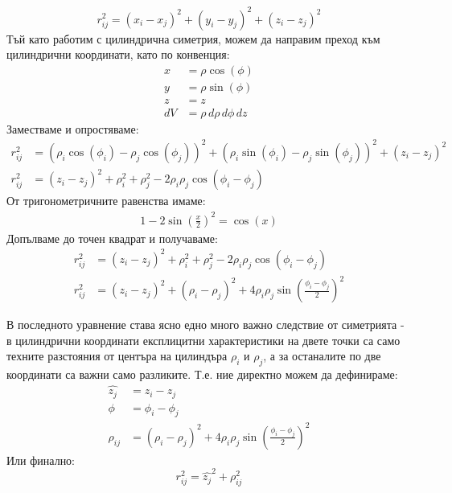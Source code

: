 \begin{equation}
	r_{ij}^2 = (x_{i} - x_{j})^2  + (y_{i} - y_{j})^2 + (z_{i}-z_{j})^2
	\label{eq:cartesian}
\end{equation}
Тъй като работим с цилиндрична симетрия, можем да направим преход към цилиндрични координати, като по конвенция:
\begin{align*}
	x  & = \rho \cos(\phi)           \\
	y  & = \rho \sin(\phi)           \\
	z  & = z                         \\
	dV & = \rho \,d\rho \,d\phi \,dz
\end{align*}
Заместваме и опростяваме:
\begin{align*}
	r_{ij}^2 & = (\rho_{i}\cos(\phi_{i}) - \rho_{j}\cos(\phi_{j}))^2 + (\rho_{i}\sin(\phi_{i}) - \rho_{j}\sin(\phi_{j}))^2 + (z_i - z_j)^2 \\
	r_{ij}^2 & = (z_i - z_j)^2 + \rho_{i}^2 + \rho_{j}^2 - 2\rho_{i}\rho_{j}\cos{(\phi_i - \phi_j)}
\end{align*}
От тригонометричните равенства имаме:
\begin{align*}
	1-2 \sin{\left(\frac{x}{2}\right)}^2=\cos (x)
\end{align*}
Допълваме до точен квадрат и получаваме:
\begin{align*}
	r_{ij}^2 & = (z_i - z_j)^2 + \rho_{i}^2 + \rho_{j}^2 - 2\rho_{i}\rho_{j}\cos{(\phi_i - \phi_j)}                    \\
	r_{ij}^2 & = (z_i - z_j)^2  + (\rho_i - \rho_j)^2 + 4 \rho_i \rho_j \sin{\left( \frac{\phi_i-\phi_j}{2} \right)}^2
\end{align*}

В последното уравнение става ясно едно много важно следствие от симетрията - в цилиндрични координати експлицитни характеристики на двете точки са само техните разстояния от центъра на
цилиндъра $\rho_{i}$ и $\rho_j$, а за останалите по две координати са важни само разликите. Т.е. ние директно можем да дефинираме:
\begin{align*}
	\hat{z_j} & = z_i - z_j                                                                            \\
	\phi      & = \phi_i - \phi_j                                                                      \\
	\rho_{ij} & = (\rho_i - \rho_j)^2 + 4 \rho_i \rho_j \sin{\left( \frac{\phi_i-\phi_j}{2} \right)}^2
\end{align*}
Или финално:
\begin{equation}
	\label{eq:cylindricalcoords}
	r_{ij}^2 =  \hat{z_{j}}^2 + \rho_{ij}^2
\end{equation}


